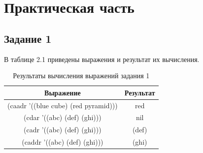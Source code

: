 \chapter{Практическая часть}

\section{Задание 1}
В таблице 2.1 приведены выражения и результат их вычисления.
\begin{table}[H]
    \centering
    \caption{Результаты вычисления выражений задания \No{}1}
	\begin{tabular}{|c|c|}
 	\hline
    Выражение & Результат \\
 	\hline
 	(caadr '((blue cube) (red pyramid))) & red \\
 	\hline
 	(cdar '((abc) (def) (ghi))) & nil \\
 	\hline
    (cadr '((abc) (def) (ghi))) & (def) \\
 	\hline
    (caddr '((abc) (def) (ghi))) & (ghi) \\
 	\hline
	\end{tabular}
\end{table}

